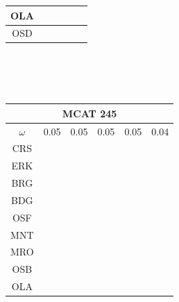 \documentclass[12pt]{article}
\begin{document}
\begin{landscape}
\begin{figure}
\begin{minipage}[c]{0.3\textwidth}
\begin{tabular}{|c|c|c|c|c|c|}
        OLA&\cellcolor[HTML]{FF7F00}&\cellcolor[HTML]{984EA3}&\cellcolor[HTML]{984EA3}&\cellcolor[HTML]{984EA3}&\cellcolor[HTML]{FF7F00}\\ \hline %
        OSD&\cellcolor[HTML]{FFFF33}&\cellcolor[HTML]{984EA3}&\cellcolor[HTML]{FF7F00}&\cellcolor[HTML]{984EA3}&\cellcolor[HTML]{FF7F00}\\ \hline %
\end{tabular}\\$~$\\$~$\\
\hspace*{-5cm}
\begin{tabular}{|c|c|c|c|c|c|}
         \hline \multicolumn{6}{|c|}{MCAT 245} \\ \hline
         $\omega$&0.05&0.05&0.05&0.05&0.04 \\ \hline
        CRS&\cellcolor[HTML]{E41A1C}&\cellcolor[HTML]{E41A1C}&\cellcolor[HTML]{E41A1C}&\cellcolor[HTML]{E41A1C}&\cellcolor[HTML]{E41A1C} \\ \hline
        ERK&\cellcolor[HTML]{377EB8}&\cellcolor[HTML]{E41A1C}&\cellcolor[HTML]{E41A1C}&\cellcolor[HTML]{377EB8}&\cellcolor[HTML]{377EB8} \\ \hline
        BRG&\cellcolor[HTML]{4DAF4A}&\cellcolor[HTML]{377EB8}&\cellcolor[HTML]{E41A1C}&\cellcolor[HTML]{377EB8}&\cellcolor[HTML]{377EB8} \\ \hline
        BDG&\cellcolor[HTML]{984EA3}&\cellcolor[HTML]{377EB8}&\cellcolor[HTML]{377EB8}&\cellcolor[HTML]{377EB8}&\cellcolor[HTML]{4DAF4A} \\ \hline
        OSF&\cellcolor[HTML]{984EA3}&\cellcolor[HTML]{377EB8}&\cellcolor[HTML]{4DAF4A}&\cellcolor[HTML]{4DAF4A}&\cellcolor[HTML]{4DAF4A} \\ \hline
        MNT&\cellcolor[HTML]{FF7F00}&\cellcolor[HTML]{4DAF4A}&\cellcolor[HTML]{984EA3}&\cellcolor[HTML]{984EA3}&\cellcolor[HTML]{984EA3} \\ \hline
        MRO&\cellcolor[HTML]{FF7F00}&\cellcolor[HTML]{4DAF4A}&\cellcolor[HTML]{984EA3}&\cellcolor[HTML]{984EA3}&\cellcolor[HTML]{984EA3} \\ \hline
        OSB&\cellcolor[HTML]{FFFF33}&\cellcolor[HTML]{4DAF4A}&\cellcolor[HTML]{FF7F00}&\cellcolor[HTML]{FF7F00}&\cellcolor[HTML]{FF7F00} \\ \hline
        OLA&\cellcolor[HTML]{FFFF33}&\cellcolor[HTML]{984EA3}&\cellcolor[HTML]{FF7F00}&\cellcolor[HTML]{FF7F00}&\cellcolor[HTML]{FF7F00} \\ \hline

\end{tabular}
\end{minipage}
\end{figure}
\end{landscape}
\end{document}
